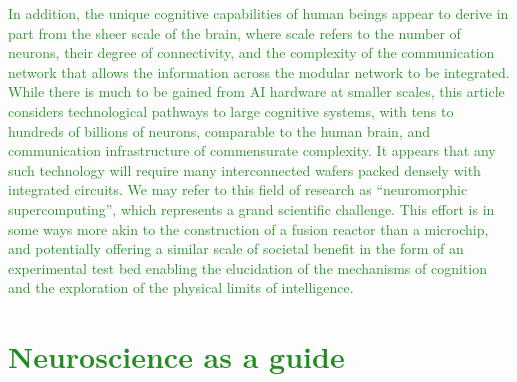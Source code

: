 \documentclass{article}
\begin{document}
\begin{multicols}{2}
\textcolor{ForestGreen}{In addition, the unique cognitive capabilities of human beings appear to derive in part from the sheer scale of the brain, where scale refers to the number of neurons, their degree of connectivity, and the complexity of the communication network that allows the information across the modular network to be integrated. While there is much to be gained from AI hardware at smaller scales, this article considers technological pathways to large cognitive systems, with tens to hundreds of billions of neurons, comparable to the human brain, and communication infrastructure of commensurate complexity. It appears that any such technology will require many interconnected wafers packed densely with integrated circuits. We may refer to this field of research as ``neuromorphic supercomputing'', which represents a grand scientific challenge. This effort is in some ways more akin to the construction of a fusion reactor than a microchip, and potentially offering a similar scale of societal benefit in the form of an experimental test bed enabling the elucidation of the mechanisms of cognition and the exploration of the physical limits of intelligence.}

\section{\label{sec:neuroscience}\textcolor{ForestGreen}{Neuroscience as a guide}}


\end{multicols}
\end{document}
